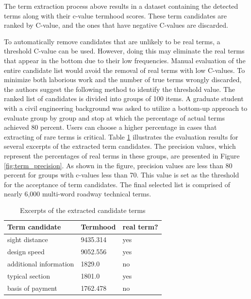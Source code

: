 \documentclass[Journal, BackFigs, DoubleSpace]{ascelike}%
\begin{document}
%
\par
The term extraction process above results in a dataset containing the detected terms along with their c-value termhood scores. These term candidates are ranked by C-value, and the ones that have negative C-values are discarded. %
\par
To automatically remove candidates that are unlikely to be real terms, a threshold C-value can be used. However, doing this may eliminate the real terms that appear in the bottom due to their low frequencies. Manual evaluation of the entire candidate list would avoid the removal of real terms with low C-values. To minimize both laborious work and the number of true terms wrongly discarded, the authors suggest the following method to identify the threshold value. The ranked list of candidates is divided into groups of 100 items. A graduate student with a civil engineering background was asked to utilize a bottom-up approach to evaluate group by group and stop at which the percentage of actual terms achieved 80 percent. Users can choose a higher percentage in cases that extracting of rare terms is critical. Table \ref{table:term_evaluation} illustrates the evaluation results for several excerpts of the extracted term candidates. The precision values, which represent the percentages of real terms in these groups, are presented in Figure \ref{fig:term_precision}. As shown in the figure, precision values are less than 80 percent for groups with c-values less than 70. This value is set as the threshold for the acceptance of term candidates. The final selected list is comprised of nearly 6,000 multi-word roadway technical terms. 
%
\begin{table} [t]
	\caption{Excerpts of the extracted candidate terms}
	\label{table:term_evaluation}
	\centering
	\small
	\renewcommand{\arraystretch}{1.25}
	\begin{tabular}{l l l}
		\hline
		\textbf{Term candidate} & \textbf{Termhood} & \textbf{real term?}\\
		\hline
		sight distance		& 9435.314 & yes\\
		design speed & 9052.556 & yes \\
		additional information & 1829.0 & no\\
		typical section & 1801.0  & yes\\
		basis of payment & 1762.478 & no\\
		\hline
	\end{tabular}
	
	\normalsize
\end{table}
\end{document}
